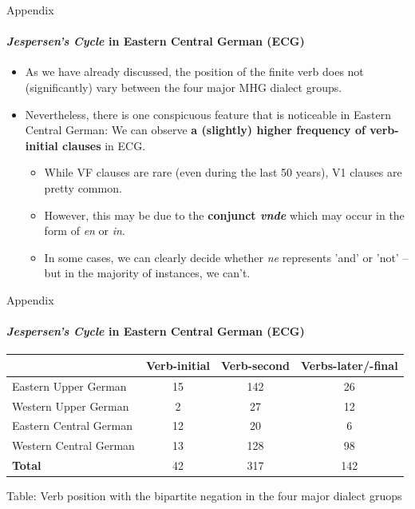 \documentclass[xcolor=table, compress, %
handout
]{beamer}
\begin{document}
\begin{frame}{Appendix}
\framesubtitle{\textit{Jespersen's Cycle} in Eastern Central German (ECG)}

\begin{itemize}
    \item As we have already discussed, the position of the finite verb does not (significantly) vary between the four major MHG dialect groups.
    \item Nevertheless, there is one conspicuous feature that is noticeable in Eastern Central German: We can observe \textbf{a (slightly) higher frequency of verb-initial clauses} in ECG.
    \begin{itemize}
        \item While VF clauses are rare (even during the last 50 years), V1 clauses are pretty common.
    \item However, this may be due to the \textbf{conjunct \textit{vnde}} which may occur in the form of \textit{en} or \textit{in}.
    \item In some cases, we can clearly decide whether \textit{ne} represents 'and' or 'not' – but in the majority of instances, we can't. 
        \end{itemize}
\end{itemize}
\end{frame}

\begin{frame}{Appendix}
\framesubtitle{\textit{Jespersen's Cycle} in Eastern Central German (ECG)}

\begin{footnotesize}
\begin{center}
\begin{tabular}{l c c c}
\toprule
 & \textbf{Verb-initial} & \textbf{Verb-second} & \textbf{Verbs-later/-final}\\
\hline
Eastern Upper German & 15 & 142 & 26\\
Western Upper German & 2 & 27 & 12\\
\alert{Eastern Central German} & \alert{12} & \alert{20} & \alert{6}\\
Western Central German & 13 & 128 & 98\\ 
\hline
\textbf{Total} & 42 & 317 & 142\\
\bottomrule
\end{tabular}
\end{center}
\end{footnotesize}

\begin{center}
Table: Verb position with the bipartite negation in the four major dialect gruops
\end{center}

\end{frame}
\end{document}

